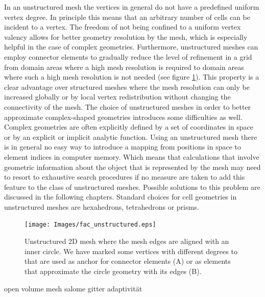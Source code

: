 \begin{frame}
In an unstructured mesh the vertices in general do not have a predefined uniform vertex degree. In principle this means that an arbitrary number of cells can be
incident to a vertex. The freedom of not being confined to a uniform vertex valency allows for better geometry resolution by the mesh, which is especially
helpful in the case of complex geometries. Furthermore, unstructured meshes can employ connector elements to gradually reduce the level of refinement in a grid
from domain areas where a high mesh resolution is required to domain areas where such a high mesh resolution is not needed (see figure \ref{fig:unstructured-fac}). This property is a clear advantage over
structured meshes where the mesh resolution can only be increased globally or by local vertex redistribution without changing the 
connectivity of the mesh. The choice of unstructured meshes in order to better approximate complex-shaped geometries introduces some difficulties as well. Complex 
geometries are often explicitly defined by a set of coordinates in space or by an explicit or implicit analytic function. Using an unstructured mesh there is 
in general no easy way to introduce a mapping from positions in space to element indices in computer memory. Which means that calculations that involve geometric 
information about the object that is represented by the mesh may need to resort to exhaustive search procedures if no measure are taken to add this feature to the 
class of unstructured meshes. Possible solutions to this problem are discussed in the following chapters. Standard choices for cell geometries in unstructured meshes are hexahedrons, tetrahedrons or prisms.\\
\begin{figure}[h!]
\begin{center}
\texttt{[image: Images/fac\_unstructured.eps]}
\end{center}
\caption{Unstructured 2D mesh where the mesh edges are aligned with an inner circle. We have marked some vertices with different 
degrees to that are used as anchor for connector elements (A) or as elements that approximate the circle geometry with its edges (B).}
\label{fig:unstructured-fac}
\end{figure}
\end{frame}

\begin{frame}
open volume mesh
salome
gitter adaptivität
\end{frame}